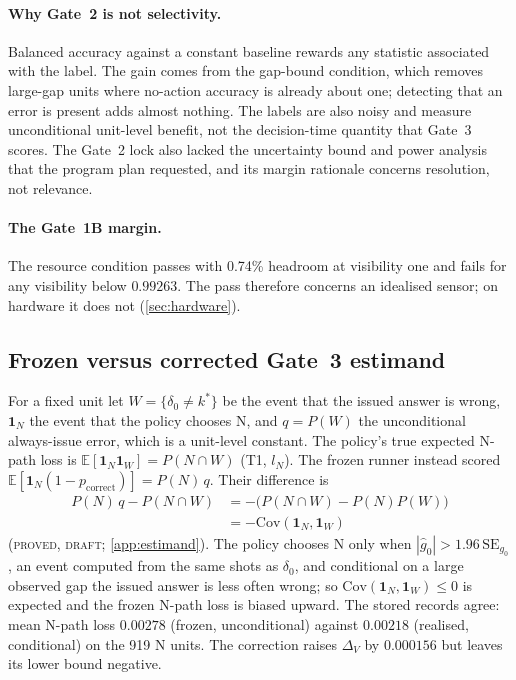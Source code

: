 \documentclass[10pt,twocolumn]{article}
\theoremstyle{definition}
\theoremstyle{remark}
\newcommand{\E}{\mathbb{E}}
\newcommand{\one}{\mathbf 1}
\newcommand{\DV}{\Delta_V}
\begin{document}
\paragraph{Why Gate~2 is not selectivity.} Balanced accuracy against a constant baseline rewards any statistic associated with the label. The gain comes from the gap-bound condition, which removes large-gap units where no-action accuracy is already about one; detecting that an error is present adds almost nothing. The labels are also noisy and measure unconditional unit-level benefit, not the decision-time quantity that Gate~3 scores. The Gate~2 lock also lacked the uncertainty bound and power analysis that the program plan requested, and its margin rationale concerns resolution, not relevance.

\paragraph{The Gate~1B margin.} The resource condition passes with 0.74\% headroom at visibility one and fails for any visibility below $0.99263$. The pass therefore concerns an idealised sensor; on hardware it does not (\cref{sec:hardware}).

\subsection{Frozen versus corrected Gate~3 estimand}\label{sec:estimand}
For a fixed unit let $W=\{\delta_0\neq k^*\}$ be the event that the issued answer is wrong, $\one_N$ the event that the policy chooses N, and $q=P(W)$ the unconditional always-issue error, which is a unit-level constant. The policy's true expected N-path loss is $\E[\one_N\one_W]=P(N\cap W)$ (T1, $l_N$). The frozen runner instead scored $\E[\one_N(1-p_{\mathrm{correct}})]=P(N)\,q$. Their difference is
\begin{equation}\label{eq:cov}
\begin{aligned}P(N)\,q-P(N\cap W)&=-\bigl(P(N\cap W)-P(N)P(W)\bigr)\\&=-\mathrm{Cov}(\one_N,\one_W)\end{aligned}
\end{equation}
(\textsc{proved, draft}; \cref{app:estimand}). The policy chooses N only when $|\hat g_0|>1.96\,\mathrm{SE}_{g_0}$, an event computed from the same shots as $\delta_0$, and conditional on a large observed gap the issued answer is less often wrong; so $\mathrm{Cov}(\one_N,\one_W)\le0$ is expected and the frozen N-path loss is biased upward. The stored records agree: mean N-path loss $0.00278$ (frozen, unconditional) against $0.00218$ (realised, conditional) on the 919 N units. The correction raises $\DV$ by $0.000156$ but leaves its lower bound negative.
\end{document}
